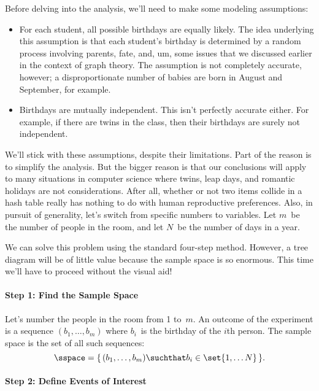 Before delving into the analysis, we'll need to make some modeling
assumptions:
\begin{itemize}

\item
For each student, all possible birthdays are equally likely.  The idea
underlying this assumption is that each student's birthday is
determined by a random process involving parents, fate, and, um, some
issues that we discussed earlier in the context of graph theory.
The assumption is not completely accurate, however; a disproportionate
number of babies are born in August and September, for example.

\item
Birthdays are mutually independent.  This isn't perfectly accurate
either.  For example, if there are twins in the class, then their
birthdays are surely not independent.

\end{itemize}
We'll stick with these assumptions, despite their limitations.  Part
of the reason is to simplify the analysis.  But the bigger reason is
that our conclusions will apply to many situations in computer science
where twins, leap days, and romantic holidays are not considerations.
After all, whether or not two items collide in a hash table really has
nothing to do with human reproductive preferences.  Also, in pursuit
of generality, let's switch from specific numbers to variables.  Let
$m$~be the number of people in the room, and let $N$~be the number of
days in a year.

We can solve this problem using the standard four-step method.
However, a tree diagram will be of little value because the sample
space is so enormous.  This time we'll have to proceed without the
visual aid!

\paragraph{Step 1: Find the Sample Space}

Let's number the people in the room from 1 to~$m$.  An outcome of the
experiment is a sequence $(b_1, \dots, b_m)$ where $b_i$~is the
birthday of the $i$th person.  The sample space is the set of all such
sequences:
\begin{equation*}
    \sspace = \{\, (b_1, \dots, b_m) \suchthat b_i \in \set{1, \dots
      N} \,\}.
\end{equation*}

\paragraph{Step 2: Define Events of Interest}

